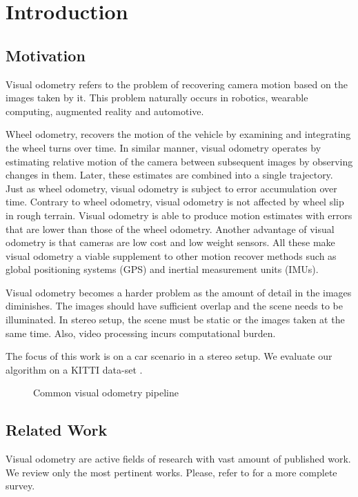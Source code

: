 \documentclass[MSc,beforeExam]{iitcsthesis}
\begin{document}
\section{Introduction}

\subsection{Motivation}
Visual odometry refers to the problem of recovering camera motion
based on the images taken by it. This problem naturally occurs in
robotics, wearable computing, augmented reality and automotive.

Wheel odometry, recovers the motion of the vehicle by examining and
integrating the wheel turns over time.  In similar manner, visual
odometry operates by estimating relative motion of the camera between
subsequent images by observing changes in them. Later, these estimates
are combined into a single trajectory. Just as wheel odometry, visual
odometry is subject to error accumulation over time. Contrary to wheel
odometry, visual odometry is not affected by wheel slip in rough
terrain. Visual odometry is able to produce motion estimates with
errors that are lower than those of the wheel odometry. Another
advantage of visual odometry is that cameras are low cost and low
weight sensors.  All these make visual odometry a viable supplement to
other motion recover methods such as global positioning systems (GPS)
and inertial measurement units (IMUs).

Visual odometry becomes a harder problem as the amount of detail in
the images diminishes. The images should have sufficient overlap
and the scene needs to be illuminated.  In stereo setup, the scene
must be static or the images taken at the same time. Also, video
processing incurs computational burden.

The focus of this work is on a car scenario in a stereo setup. We
evaluate our algorithm on a KITTI data-set \cite{Geiger2012}.

\begin{figure}[h]
  \centering
  \caption{Common visual odometry pipeline}
\end{figure}

\subsection{Related Work}
Visual odometry are active fields of research with vast amount of
published work.  We review only the most pertinent works. Please,
refer to \cite{Scaramuzza2011} for a more complete survey.
\end{document}
